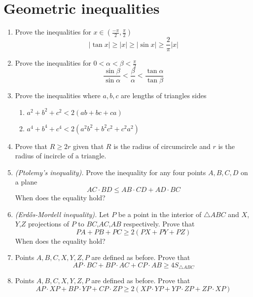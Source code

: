 \documentclass{article}
\begin{document}
\section*{Geometric inequalities}
	\begin{enumerate}
		\item %
		Prove the inequalities for $x \in \left(\frac{-\pi}{2},\frac{\pi}{2}\right)$
		$$|\tan x| \geq |x| \geq |\sin x| \geq  \frac{2}{\pi}|x|$$
		\item %
		Prove the inequalities for $0 < \alpha < \beta < \frac{\pi}{2}$
		$$\frac{\sin \beta}{\sin \alpha} < \frac{\beta}{\alpha} < \frac{\tan \alpha}{\tan \beta}$$
		\item %
		Prove the inequalities where $a,b,c$ are lengths of triangles sides
		\begin{enumerate}
			\item $a^2 + b^2 + c^2 < 2 (ab + bc + ca)$
			\item $a^4 + b^4 + c^4 < 2 (a^2b^2 + b^2c^2 + c^2a^2)$
		\end{enumerate}  
		\item %
		Prove that $R \geq 2r$ given that $R$ is the radius of circumcircle and $r$ is the radius of incircle of a triangle.	
		\item \emph{(Ptolemy's inequality).}
		Prove the inequality for any four points $A,B,C,D$ on a plane
		$$AC \cdot BD \leq AB \cdot CD + AD \cdot BC$$	
		When does the equality hold?
		\item \emph{(Erdős-Mordell inequality).} %
		Let $P$ be a point in the interior of $\triangle ABC$ and $X$, $Y$,$Z$ projections of $P$ to $BC$,$AC$,$AB$ respectively. Prove that
		$$PA+PB+PC \geq 2(PX+PY+PZ)$$
		When does the equality hold?
		\item %
		Points $A,B,C,X,Y,Z,P$ are defined as before. Prove that
		$$AP \cdot BC + BP \cdot AC + CP \cdot AB \geq 4S_{\triangle ABC} $$
		\item %
		Points $A,B,C,X,Y,Z,P$ are defined as before. Prove that
		$$AP \cdot XP + BP \cdot YP + CP \cdot ZP \geq 2(XP \cdot YP + YP \cdot ZP + ZP \cdot XP) $$
		
	\end{enumerate}
\end{document}
